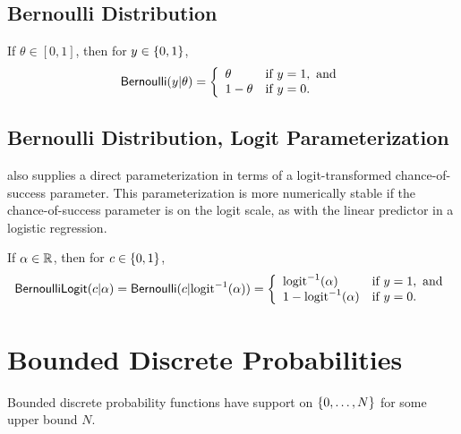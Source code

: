 \subsection{Bernoulli Distribution}

If $\theta \in [0,1]$, then for $y \in \{ 0,1 \}$, 
\[
\mbox{\sf Bernoulli}(y|\theta)
=
\left\{
\begin{array}{ll}
\theta & \mbox{if } y = 1, \mbox{ and}
\\
1 - \theta & \mbox{if } y = 0.
\end{array}
\right.
\]
\begin{description}
%
%
\end{description}

\subsection{Bernoulli Distribution, Logit Parameterization}

\Stan also supplies a direct parameterization in terms of a
logit-transformed chance-of-success parameter.  This parameterization
is more numerically stable if the chance-of-success parameter is on
the logit scale, as with the linear predictor in a logistic
regression.  

If $\alpha \in \mathbb{R}$, then for $c \in \{ 0,1 \}$,
\[
\mbox{\sf BernoulliLogit}(c|\alpha)
=
\mbox{\sf Bernoulli}(c|\mbox{logit}^{-1}(\alpha))
= 
\left\{
\begin{array}{ll}
\mbox{logit}^{-1}(\alpha) & \mbox{if } y = 1, \mbox{ and}
\\
1 - \mbox{logit}^{-1}(\alpha) & \mbox{if } y = 0.
\end{array}
\right.
\]
\begin{description}
%
%
\end{description}

\section{Bounded Discrete Probabilities}\label{betafun.section}

Bounded discrete probability functions have support on
$\{ 0,\ldots,N \}$ for some upper bound $N$.

